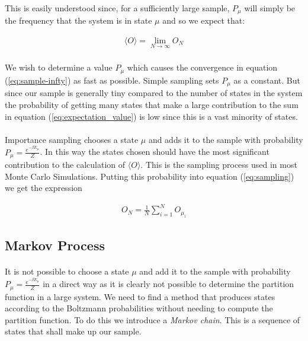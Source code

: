 \documentclass[12pt] {report} %
\begin{document}
				\paragraph{}
					This is easily understood since, for a sufficiently large sample, $P_{\mu}$ will simply be the frequency that the system is in state $\mu$ and so we expect that:
					
				\begin{align}
					\langle O \rangle = \lim_{N\to\infty} O_N	\label{eq:sample-infty}
				\end{align}
				
				\paragraph{}
					We wish to determine a value $P_{\mu}$ which causes the convergence in equation (\ref{eq:sample-infty}) as fast as possible. Simple sampling sets $P_{\mu}$ as a constant. But since our sample is generally tiny compared to the number of states in the system the probability of getting many states that make a large contribution to the sum in equation (\ref{eq:expectation_value}) is low since this is a vast minority of states.
					
				\paragraph{}
					Importance sampling chooses a state $\mu$ and adds it to the sample with probability $P_{\mu} = \frac{e^{-\beta E_\mu}}{Z}$. In this way the states chosen should have the most significant contribution to the calculation of $\langle O \rangle$. This is the sampling process used in most Monte Carlo Simulations.
					Putting this probability into equation (\ref{eq:sampling}) we get the expression
					
			\begin{align}
				O_N = \frac{1}{N} \sum_{i=1}^{N} O_{\mu_i}		\label{eq:observable_estimator}
			\end{align}

			\subsection{Markov Process}
			
			\paragraph{}
				It is not possible to choose a state $\mu$ and add it to the sample with probability $P_{\mu} = \frac{e^{-\beta E_\mu}}{Z}$ in a direct way as it is clearly not possible to determine the partition function in a large system. We need to find a method that produces states according to the Boltzmann probabilities without needing to compute the partition function.  To do this we introduce a \textit{Markov chain}. This is a sequence of states that shall make up our sample.
				
\end{document}
